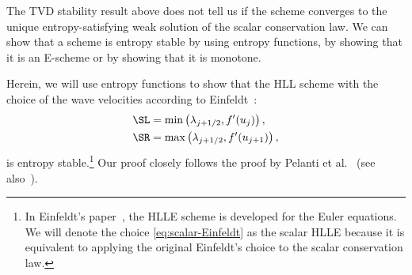 
The TVD stability result above does not tell us if the scheme converges to the unique entropy-satisfying weak solution of the scalar conservation law. We can show that a scheme is entropy stable by using entropy functions, by showing that it is an E-scheme or by showing that it is monotone.

Herein, we will use entropy functions to show that the HLL scheme with the choice of the wave velocities according to Einfeldt~\cite{ein88}:
\begin{subequations} \label{eq:scalar-Einfeldt}
\begin{align}
\SL & = \min \left( \lambda_{j+1/2}, f'(u_j) \right), \\
\SR & = \max \left( \lambda_{j+1/2}, f'(u_{j+1}) \right),
\end{align}
\end{subequations}
is entropy stable.\footnote{In Einfeldt's paper~\cite{ein88}, the HLLE scheme is developed for the Euler equations. We will denote the choice \eqref{eq:scalar-Einfeldt} as the scalar HLLE because it is equivalent to applying the original Einfeldt's choice to the scalar conservation law.} Our proof closely follows the proof by Pelanti et al.~\cite[p.~12]{pel01} (see also~\cite{har83c,god96}).

